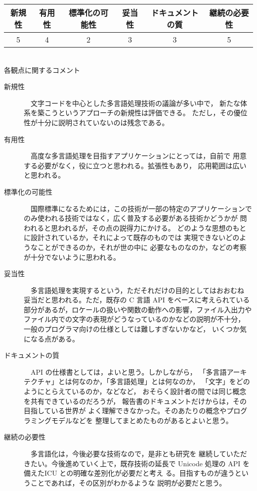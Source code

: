 \begin{tabular}{|c|c|c|c|c|c|}
\hline
新規性 & 有用性 & 標準化の可能性 & 妥当性 & ドキュメントの質 & 継続の必要性 \\
\hline
5 & 4 & 2 & 3 & 3 & 5 \\
\hline
\end{tabular}

\ \\

各観点に関するコメント
\begin{description}
\item[新規性]~\
	文字コードを中心とした多言語処理技術の議論が多い中で，
	新たな体系を築こうというアプローチの新規性は評価できる。
	ただし，その優位性が十分に説明されていないのは残念である。

\item[有用性]~\
	高度な多言語処理を目指すアプリケーションにとっては，自前で
	用意する必要がなく，役に立つと思われる。拡張性もあり，
	応用範囲は広いと思われる。

\item[標準化の可能性]~\
	国際標準になるためには，この技術が一部の特定のアプリケーションで
	のみ使われる技術ではなく，広く普及する必要がある技術かどうかが
	問われると思われるが，その点の説得力にかける。
	どのような思想のもとに設計されているか，それによって既存のものでは
	実現できないどのようなことができるのか，それが世の中に
	必要なものなのか，などの考察が十分でないように思われる。

\item[妥当性]~\
	多言語処理を実現するという，ただそれだけの目的としてはおおむね
	妥当だと思われる。ただ，既存の C 言語 API をベースに考えられている
	部分があるが，ロケールの扱いや関数の動作への影響，ファイル入出力や
	ファイル内での文字の表現がどうなっているのかなどの説明が不十分，
	一般のプログラマ向けの仕様としては難しすぎないかなど，
	いくつか気になる点がある。

\item[ドキュメントの質]~\
	API の仕様書としては，よいと思う。しかしながら，
	「多言語アーキテクチャ」とは何なのか，「多言語処理」とは何なのか，
	「文字」をどのようにとらえているのか，などなど，
	おそらく設計者の間では同じ概念を共有できているのだろうが，
	報告書のドキュメントだけからは，その目指している世界が
	よく理解できなかった。そのあたりの概念やプログラミングモデルなどを
	整理してまとめたものがあるとよいと思う。

\item[継続の必要性]~\ 
       多言語化は，今後必要な技術なので，是非とも研究を
        継続していただきたい。今後進めていく上で，既存技術の延長で 
        Unicode 処理の API を備えたICU との明確な差別化が必要だと考え
        る。目指すものが違うということであれば，その区別がわかるような
        説明が必要だと思う。

\end{description}

